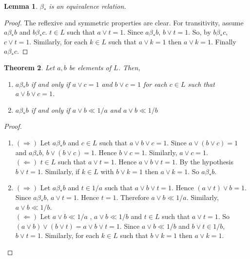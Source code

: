 \documentclass[a4paper,12pt]{article}
\newtheorem{theorem}{Theorem}[section]
\newtheorem{lemma}[theorem]{Lemma}
\numberwithin{equation}{section}
\begin{document}
\begin{lemma} \label{2}
  $ \beta_* $ is an equivalence relation.
\end{lemma}
\begin{proof}
  The reflexive and symmetric properties are clear. For transitivity, assume $ a \beta_*b $ and $ b \beta_* c $. 
  $ t \in L $ such that $ a \vee t = 1 $. Since $ a \beta_*b $, $ b \vee t = 1 $. So,  by $ b \beta_* c $, 
  $ c \vee t = 1 $. Similarly, for each $ k \in L $ such that $ a \vee k = 1 $ then $ a \vee k=1 $. 
  Finally $ a \beta_* c $.

\end{proof}

\begin{theorem} \label{3}
  Let $ a,b $ be elements of $ L $. Then,
  \begin{enumerate}[label=(\roman{*}), ref=(\roman{*})]

    \item
      $ a \beta_* b $ if and only if $ a \vee c = 1 $ and $ b \vee c = 1 $ for each $ c \in L $ 
      such that $ a \vee b  \vee c = 1 $.  \label{3.1}

    \item
      $ a \beta_* b $ if and only if $ a \vee b \ll 1/a $ and $ a \vee b \ll 1/b $  \label{3.2}

  \end{enumerate}
\end{theorem}


\begin{proof}
  \begin{enumerate}
    \item
      $ ( \Rightarrow ) $
      Let $ a \beta_* b$ and $ c \in L $ such that $ a \vee b \vee c = 1 $. Since $ a \vee ( b \vee c ) = 1 $ and 
      $ a \beta_* b $, $ b \vee ( b \vee c ) = 1 $. Hence $ b \vee c = 1 $. Similarly, $ a \vee c = 1 $. \\
      $( \Leftarrow )$
      $ t \in L $ such that $ a \vee t = 1 $. 
      Hence $ a \vee b \vee t = 1 $. By the hypothesis $ b \vee t = 1 $. 
      Similarly, if $ k \in L $ with $ b \vee k = 1 $ then $ a \vee k = 1 $. So $ a \beta_* b $.
    \item
      $ ( \Rightarrow ) $
      Let $ a \beta_* b $ and $ t \in 1/a $ such that $ a \vee b \vee t = 1 $. 
      Hence $ ( a \vee t ) \vee b = 1 $. Since $ a \beta_* b $, $ a \vee t = 1 $. 
      Hence $ t=1 $. Therefore $ a \vee b \ll 1/a $. Similarly, $ a \vee b \ll 1/b $. \\
      $( \Leftarrow )$
      Let $ a \vee b \ll 1/a $ , $ a \vee b \ll 1/b $ and $ t \in L $ such that $ a \vee t = 1 $. 
      So $ ( a \vee b ) \vee ( b \vee t ) = a \vee b \vee t = 1 $. Since $ a \vee b \ll 1/b $ and 
      $ b \vee t \in 1/b $, $ b \vee t = 1 $. 
      Similarly, for each $ k \in L $ such that $ b \vee k = 1 $ then $ a \vee k = 1 $. 
  \end{enumerate}
\end{proof}
\end{document}
